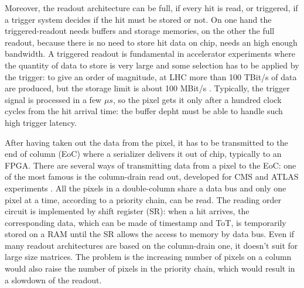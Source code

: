    Moreover, the readout architecture can be full, if every hit is read, or triggered, if a trigger system decides if the hit must be stored or not. On one hand the triggered-readout needs buffers and storage memories, on the other the full readout, because there is no need to store hit data on chip, needs an high enough bandwidth.
   A triggered readout is fundamental in accelerator experiments where the quantity of data to store is very large and some selection has to be applied by the trigger: to give an order of magnitude, at LHC more than 100 TBit/s of data are produced, but the storage limit is about 100 MBit/s \cite{K-Wermes}.
   Typically, the trigger signal is processed in a few $\mu s$, so the pixel gets it only after a hundred clock cycles from the hit arrival time: the buffer depht must be able to handle such high trigger latency. 
 
   After having taken out the data from the pixel, it has to be transmitted to the end of column (EoC) where a serializer delivers it out of chip, typically to an FPGA.
   There are several ways of transmitting data from a pixel to the EoC: one of the most famous is the column-drain read out, developed for CMS and ATLAS experiments \cite{column-drain}. 
   All the pixels in a double-column share a data bus and only one pixel at a time, according to a priority chain, can be read. The reading order circuit is implemented by shift register (SR): when a hit arrives, the corresponding data, which can be made of timestamp and ToT, is temporarily stored on a RAM until the SR allows the access to memory by data bus. 
   Even if many readout architectures are based on the column-drain one, it doesn't suit for large size matrices. The problem is the increasing number of pixels on a column would also raise the number of pixels in the priority chain, which would result in a slowdown of the readout. 

